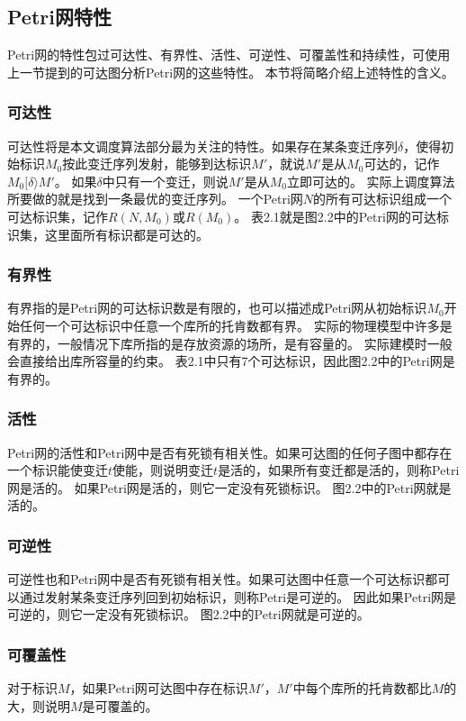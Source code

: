     \subsection{Petri网特性}
    Petri网的特性包过可达性、有界性、活性、可逆性、可覆盖性和持续性\cite{jcj2003}，可使用上一节提到的可达图分析Petri网的这些特性。
    本节将简略介绍上述特性的含义。
    \subsubsection{可达性}
    可达性将是本文调度算法部分最为关注的特性。如果存在某条变迁序列$\delta $，使得初始标识$M_0$按此变迁序列发射，能够到达标识$M'$，就说$M'$是从$M_0$可达的，记作$M_0[\delta\rangle M'$。
    如果$\delta $中只有一个变迁，则说$M'$是从$M_0$立即可达的。
    实际上调度算法所要做的就是找到一条最优的变迁序列。
    一个Petri网$N$的所有可达标识组成一个可达标识集，记作$R(N,M_0)$或$R(M_0)$。
    表2.1就是图2.2中的Petri网的可达标识集，这里面所有标识都是可达的。
    \subsubsection{有界性}
    有界指的是Petri网的可达标识数是有限的，也可以描述成Petri网从初始标识$M_0$开始任何一个可达标识中任意一个库所的托肯数都有界。
    实际的物理模型中许多是有界的，一般情况下库所指的是存放资源的场所，是有容量的。
    实际建模时一般会直接给出库所容量的约束。
    表2.1中只有7个可达标识，因此图2.2中的Petri网是有界的。
    \subsubsection{活性}
    Petri网的活性和Petri网中是否有死锁有相关性。如果可达图的任何子图中都存在一个标识能使变迁$t$使能，则说明变迁$t$是活的，如果所有变迁都是活的，则称Petri网是活的。
    如果Petri网是活的，则它一定没有死锁标识。
    图2.2中的Petri网就是活的。
    \subsubsection{可逆性}
    可逆性也和Petri网中是否有死锁有相关性。如果可达图中任意一个可达标识都可以通过发射某条变迁序列回到初始标识，则称Petri是可逆的。
    因此如果Petri网是可逆的，则它一定没有死锁标识。
    图2.2中的Petri网就是可逆的。
    \subsubsection{可覆盖性}
    对于标识$M$，如果Petri网可达图中存在标识$M'$，$M'$中每个库所的托肯数都比$M$的大，则说明$M$是可覆盖的。
